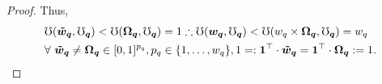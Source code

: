 \documentclass[hidelinks, nonatbib]{elsarticle}
\begin{document}
\begin{lemma}
\begin{proof}
        Thus, 
        \begin{align}
            &
            \mho(
                \boldsymbol{\tilde{w}_{q}},
                \boldsymbol{\mho_q}
            ) 
            < 
            \mho(
                \boldsymbol{\Omega_{q}},
                \boldsymbol{\mho_q}
            ) 
            = 1
            \therefore
            \mho(
                \boldsymbol{w_{q}},
                \boldsymbol{\mho_q}
            )
            < 
            \mho(
                w_{q}
                \times
                \boldsymbol{\Omega_{q}},
                \boldsymbol{\mho_q}
            ) 
            = w_q
            \\
            &
            \forall
            \
            \boldsymbol{\tilde{w}_{q}}
            \neq
            \boldsymbol{\Omega_{q}}
            \in
            [0,1]^{p_q}
            ,
            p_q \in \{1, \dots, w_q\}
            ,
            1 =:
            \boldsymbol{1} ^ {\top}
            \cdot
            \boldsymbol{\tilde{w}_{q}}
            =
            \boldsymbol{1} ^ {\top}
            \cdot
            \boldsymbol{\Omega_{q}}
            := 1
            .
        \end{align}
        

\end{proof}
\end{lemma}
\end{document}
